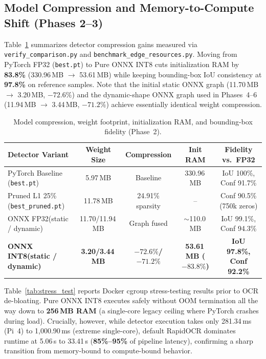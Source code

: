 \documentclass[pdflatex,sn-mathphys-num]{sn-jnl}
\begin{document}
\subsection{Model Compression and Memory-to-Compute Shift (Phases 2--3)}\label{subsec:exp_bottleneck}
Table~\ref{tab:compression_ram} summarizes detector compression gains measured via \texttt{verify\_comparison.py} and \texttt{benchmark\_edge\_resources.py}. Moving from PyTorch FP32 (\texttt{best.pt}) to Pure ONNX INT8 cuts initialization RAM by \textbf{83.8\%} (330.96\,MB $\rightarrow$ 53.61\,MB) while keeping bounding-box IoU consistency at \textbf{97.8\%} on reference samples. Note that the initial static ONNX graph (11.70\,MB $\rightarrow$ 3.20\,MB, $-72.6\%$) and the dynamic-shape ONNX graph used in Phases~4--6 (11.94\,MB $\rightarrow$ 3.44\,MB, $-71.2\%$) achieve essentially identical weight compression.

\begin{table}[t]
\centering
\caption{Model compression, weight footprint, initialization RAM, and bounding-box fidelity (Phase~2).}\label{tab:compression_ram}
{\fontsize{6.4pt}{7.8pt}\selectfont\setlength{\tabcolsep}{1.8pt}
\begin{tabular}{@{}>{\raggedright\arraybackslash}p{2.95cm}cccc@{}}
\toprule
\textbf{Detector Variant} & \textbf{Weight Size} & \textbf{Compression} & \textbf{Init RAM} & \textbf{Fidelity vs.\ FP32} \\
\midrule
PyTorch Baseline (\texttt{best.pt}) & 5.97\,MB & Baseline & 330.96\,MB & IoU 100\%, Conf 91.7\% \\
Pruned L1 25\% (\texttt{best\_pruned.pt}) & 11.78\,MB & 24.91\% sparsity & -- & Conf 90.5\% (750k zeros) \\
ONNX FP32\newline(static / dynamic) & 11.70/11.94\,MB & Graph fused & $\sim$110.0\,MB & IoU 99.1\%, Conf 94.3\% \\
\textbf{ONNX INT8}\newline\textbf{(static / dynamic)} & \textbf{3.20/3.44\,MB} & \textbf{$-72.6\%$/$-71.2\%$} & \textbf{53.61\,MB ($-83.8\%$)} & \textbf{IoU 97.8\%, Conf 92.2\%} \\
\bottomrule
\end{tabular}%
}
\end{table}

Table~\ref{tab:stress_test} reports Docker cgroup stress-testing results prior to OCR de-bloating. Pure ONNX INT8 executes safely without OOM termination all the way down to \textbf{256\,MB RAM} (a single-core legacy ceiling where PyTorch crashes during load). Crucially, however, while detector execution takes only 281.34\,ms (Pi~4) to 1,000.90\,ms (extreme single-core), default RapidOCR dominates runtime at 5.06\,s to 33.41\,s (\textbf{85\%--95\%} of pipeline latency), confirming a sharp transition from memory-bound to compute-bound behavior.
\end{document}

